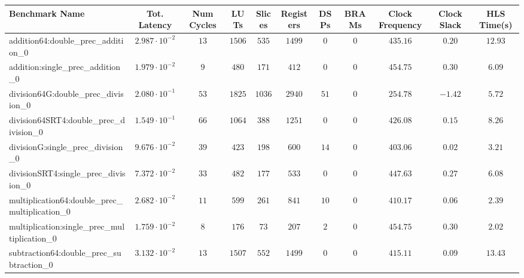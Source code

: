 \begin{tabular}{|l|c|c|c|c|c|c|c|c|c|c|}
\hline
Benchmark Name                                   & Tot. Latency            & Num Cycles & LUTs     & Slices   & Registers & DSPs   & BRAMs & Clock Frequency & Clock Slack & HLS Time(s) \\
\hline
addition64:double\_prec\_addition\_0             & $ 2.987 \cdot 10^{-2} $ & $ 13     $ & $ 1506 $ & $ 535  $ & $ 1499  $ & $ 0  $ & $ 0 $ & $ 435.16      $ & $ 0.20    $ & $ 12.93   $ \\
addition:single\_prec\_addition\_0               & $ 1.979 \cdot 10^{-2} $ & $ 9      $ & $ 480  $ & $ 171  $ & $ 412   $ & $ 0  $ & $ 0 $ & $ 454.75      $ & $ 0.30    $ & $ 6.09    $ \\
division64G:double\_prec\_division\_0            & $ 2.080 \cdot 10^{-1} $ & $ 53     $ & $ 1825 $ & $ 1036 $ & $ 2940  $ & $ 51 $ & $ 0 $ & $ 254.78      $ & $ -1.42   $ & $ 5.72    $ \\
division64SRT4:double\_prec\_division\_0         & $ 1.549 \cdot 10^{-1} $ & $ 66     $ & $ 1064 $ & $ 388  $ & $ 1251  $ & $ 0  $ & $ 0 $ & $ 426.08      $ & $ 0.15    $ & $ 8.26    $ \\
divisionG:single\_prec\_division\_0              & $ 9.676 \cdot 10^{-2} $ & $ 39     $ & $ 423  $ & $ 198  $ & $ 600   $ & $ 14 $ & $ 0 $ & $ 403.06      $ & $ 0.02    $ & $ 3.21    $ \\
divisionSRT4:single\_prec\_division\_0           & $ 7.372 \cdot 10^{-2} $ & $ 33     $ & $ 482  $ & $ 177  $ & $ 533   $ & $ 0  $ & $ 0 $ & $ 447.63      $ & $ 0.27    $ & $ 6.08    $ \\
multiplication64:double\_prec\_multiplication\_0 & $ 2.682 \cdot 10^{-2} $ & $ 11     $ & $ 599  $ & $ 261  $ & $ 841   $ & $ 10 $ & $ 0 $ & $ 410.17      $ & $ 0.06    $ & $ 2.39    $ \\
multiplication:single\_prec\_multiplication\_0   & $ 1.759 \cdot 10^{-2} $ & $ 8      $ & $ 176  $ & $ 73   $ & $ 207   $ & $ 2  $ & $ 0 $ & $ 454.75      $ & $ 0.30    $ & $ 2.02    $ \\
subtraction64:double\_prec\_subtraction\_0       & $ 3.132 \cdot 10^{-2} $ & $ 13     $ & $ 1507 $ & $ 552  $ & $ 1499  $ & $ 0  $ & $ 0 $ & $ 415.11      $ & $ 0.09    $ & $ 13.43   $ \\

\end{tabular}

